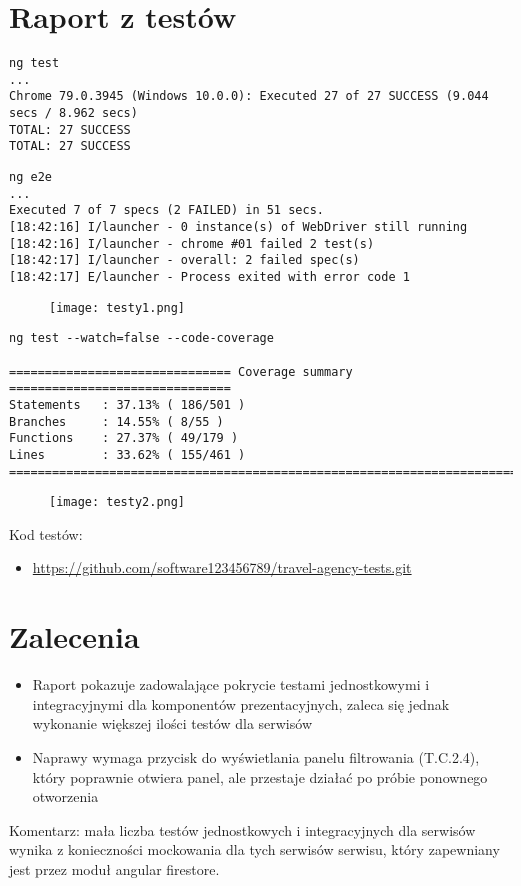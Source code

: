 \documentclass[a4paper,15pt]{article}
\begin{document}
\newpage
\section{Raport z testów}
\begin{lstlisting}
ng test
...
Chrome 79.0.3945 (Windows 10.0.0): Executed 27 of 27 SUCCESS (9.044 secs / 8.962 secs)
TOTAL: 27 SUCCESS
TOTAL: 27 SUCCESS
\end{lstlisting}


\begin{lstlisting}
ng e2e
...
Executed 7 of 7 specs (2 FAILED) in 51 secs.
[18:42:16] I/launcher - 0 instance(s) of WebDriver still running
[18:42:16] I/launcher - chrome #01 failed 2 test(s)
[18:42:17] I/launcher - overall: 2 failed spec(s)
[18:42:17] E/launcher - Process exited with error code 1
\end{lstlisting}

\begin{figure}[H]
\centerline{\texttt{[image: testy1.png]}}
\end{figure}

\newpage
\begin{lstlisting}
ng test --watch=false --code-coverage

=============================== Coverage summary ===============================
Statements   : 37.13% ( 186/501 )
Branches     : 14.55% ( 8/55 )
Functions    : 27.37% ( 49/179 )
Lines        : 33.62% ( 155/461 )
================================================================================
\end{lstlisting}

\begin{figure}[H]
\centerline{\texttt{[image: testy2.png]}}
\end{figure}

Kod testów:
\begin{itemize}
\item \url{https://github.com/software123456789/travel-agency-tests.git}
\end{itemize}


\section{Zalecenia}

\begin{itemize}
\item Raport pokazuje zadowalające pokrycie testami jednostkowymi i integracyjnymi dla komponentów prezentacyjnych, zaleca się jednak wykonanie większej ilości testów dla serwisów 
\item Naprawy wymaga przycisk do wyświetlania panelu filtrowania (T.C.2.4), który poprawnie otwiera panel, ale przestaje działać po próbie ponownego otworzenia
\end{itemize}

Komentarz: mała liczba testów jednostkowych i integracyjnych dla serwisów wynika z konieczności mockowania dla tych serwisów serwisu, który zapewniany jest przez moduł angular firestore.
\end{document}
